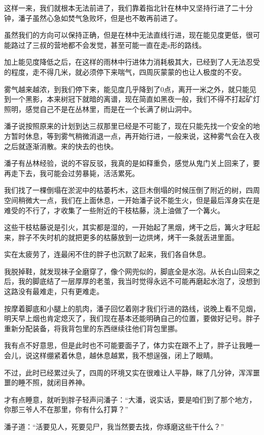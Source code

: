 这样一来，我们就根本无法前进了，我们靠着指北针在林中又坚持行进了二十分钟，潘子虽然心急如焚气急败坏，但是也不敢再前进了。

虽然我们的方向可以保持正确，但是在林中无法直线行进，现在能见度更低，很可能路过了三叔的营地都不会发觉，甚至可能一直在走s形的路线。

加上能见度降低之后，在这样的雨林中行进体力消耗极其大，已经到了人无法忍受的程度，走不得几米，就必须停下来喘气，四周灰蒙蒙的也让人极度的不安。

雾气越来越浓，到我们停下来，能见度几乎降到了0点，离开一米之外，就只能见到一个黑影，本来树冠下就暗的离谱，现在简直如黑夜一般，我们不得不打起矿灯照明，感觉自己不是在丛林里，而是在一个长满了树山洞中。

潘子说按照原来的计划到达三叔那里已经是不可能了，现在只能先找一个安全的地方暂时休息，等到雾气稍微消退一点，再开始行进，一般来说，这种雾气会在入夜之后就逐渐消散。来的快去的也快。

潘子有丛林经验，说的不容反驳，我真的是如释重负，感觉从鬼门关上回来了，要再走下去，我可能会过劳暴毙，活活累死。

我们找了一棵倒塌在淤泥中的枯萎朽木，这巨木倒塌的时候压倒了附近的树，四周空间稍微大一点，我们在上面休息，一开始潘子说不能生火，但是最后浑身实在是难受的不行了，才收集了一些附近的干枝枯藤，浇上油做了一个篝火。

这些干枝枯藤说是引火，其实都是湿的，一开始起了黑烟，烤干之后，篝火才旺起来，胖子不失时机的就把更多的枯藤放到一边烘烤，烤干一条就丢进里面。

实在太疲劳了，连最闲不住的胖子也沉默了起来，我们各自休息。

我脱掉鞋，就发现袜子全磨穿了，像个网兜似的，脚底全是水泡。从长白山回来之后，我的脚底结了一层厚厚的老茧，我当时觉得永远不可能再磨起水泡了，没想到这路没有最难走，只有更难走。

按摩着脚底和小腿上的肌肉，潘子回忆着刚才我们行进的路线，说晚上看不见烟，明天早上烟也肯定熄灭了，我们现在基本还能明确自己的位置，要做好记号。胖子重新分配装备，将我背包里的东西继续往他们背包里挪。

我有点不好意思，但是此时也不可能要面子了，体力实在跟不上了，胖子让我睡一会儿，说这样绷紧着休息，越休息越累，我不想逞强，闭上了眼睛。

不过，此时已经累过头了，四周的环境又实在很难让人平静，眯了几分钟，浑浑噩噩的睡不照，就闭目养神。

才有点睡意，就听到胖子轻声问潘子：“大潘，说实话，要是咱们到了那个地方，你那三爷人不在那里，你有什么打算？”

潘子道：“活要见人，死要见尸，我当然要去找，你琢磨这些干什么？”

